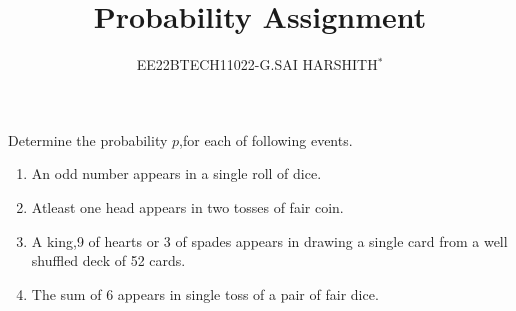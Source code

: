 \documentclass[journal,12pt,twocolumn]{IEEEtran}
\theoremstyle{remark}
\begin{document}

\vspace{3cm}

\title{Probability Assignment}
\author{EE22BTECH11022-G.SAI HARSHITH$^{*}$%
}
\maketitle
\newpage
\bigskip
\renewcommand{\thefigure}{\theenumi}
\renewcommand{\thetable}{\theenumi}

Determine the probability $p$,for each of following events.
\begin{enumerate}
\item An odd number appears in a single roll of dice.
\item Atleast one head appears in two tosses of fair coin.
\item A king,9 of hearts or 3 of spades appears in drawing a single card from a well shuffled deck of 52 cards.
\item The sum of 6 appears in single toss of a pair of fair dice.
\end{enumerate}
\fi
\solution
\end{document}
